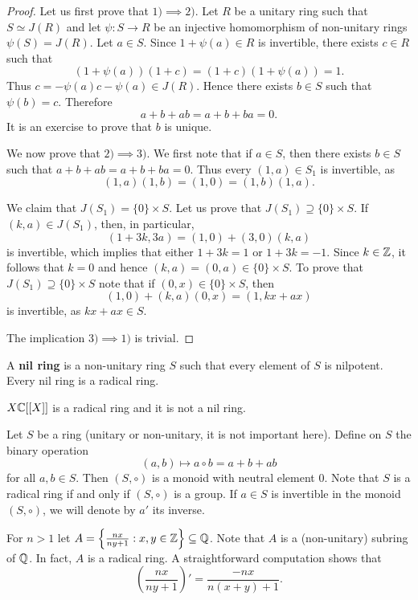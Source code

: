 \begin{proof}
    Let us first prove that $1)\implies2)$. Let $R$ be a unitary ring such that 
    $S\simeq J(R)$ and let $\psi\colon S\rightarrow R$ be an injective homomorphism 
    of non-unitary rings $\psi(S)=J(R)$. Let $a\in S$. Since  
    $1+\psi(a)\in R$ is invertible, there exists $c\in R$ such that 
    \[
    (1+\psi(a))(1+c)=(1+c)(1+\psi(a))=1.
    \]
    Thus 
    $c=-\psi(a)c-\psi(a)\in J(R)$. 
    Hence there exists $b\in S$ such that $\psi(b)=c$. Therefore 
    \[
    a+b+ab=a+b+ba=0.
    \]
    It is an exercise to prove that $b$ is unique. 
    
    We now prove that $2)\implies 3)$. We first note that if 
    $a\in S$, then there exists $b\in S$ such that $a+b+ab=a+b+ba=0$. 
    Thus every 
    $(1,a)\in S_1$ is invertible, as 
    \[
    (1,a)(1,b)=(1,0)=(1,b)(1,a).
    \]

    We claim that $J(S_1)=\{0\}\times S$. Let us prove that 
    $J(S_1)\supseteq \{0\}\times S$. If $(k,a)\in J(S_1)$, then, in particular, 
    \[
    (1+3k,3a)=(1,0)+(3,0)(k,a)
    \]
    is invertible, which implies that either $1+3k=1$ or $1+3k=-1$. Since
    $k\in\mathbb{Z}$, it follows that $k=0$ and hence $(k,a)=(0,a)\in\{0\}\times S$. 
    To prove that 
    $J(S_1)\supseteq \{0\}\times S$ note that
    if $(0,x)\in\{0\}\times S$, then
    \[
    (1,0)+(k,a)(0,x)=(1,kx+ax)
    \]
    is invertible, as $kx+ax\in S$. 
    
    The implication $3)\implies1)$ is trivial.
\end{proof}

A \textbf{nil ring} is a non-unitary ring $S$ such that every 
element of $S$ is nilpotent. Every nil ring is a radical ring.

\begin{example} 
    $X\mathbb{C}[[X]]$ is a radical ring and it is not a nil ring.
\end{example}

Let $S$ be a ring (unitary or non-unitary, it is not important here). 
Define on $S$ the binary operation 
\[
(a,b)\mapsto a\circ b=a+b+ab
\]
for all $a,b\in S$. Then $(S,\circ)$ is a monoid with neutral element $0$.
Note that $S$ is a radical ring if and only if $(S,\circ)$ is a group. 
If $a\in S$ is invertible in the monoid $(S,\circ)$, we will denote by $a'$ its inverse.

\begin{example}
	For $n>1$ let $A=\left\{\frac{nx}{ny+1}:x,y\in\mathbb{Z}\right\}\subseteq \mathbb{Q}$. 
	Note that $A$ is a (non-unitary) subring of $\mathbb{Q}$. In fact, $A$ is a radical ring. A straightforward computation shows that 
	\[
	\left(\frac{nx}{ny+1}\right)'=\frac{-nx}{n(x+y)+1}.
	\]
\end{example}

